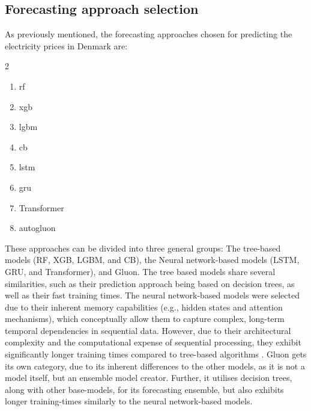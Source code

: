 \subsection{Forecasting approach selection}
As previously mentioned, the forecasting approaches chosen for predicting the 
electricity prices in Denmark are:
\begin{multicols}{2}
	\begin{enumerate}
		\item \gls{rf}
		\item \gls{xgb}
		\item \gls{lgbm}
		\item \gls{cb}
		\item \gls{lstm}
		\item \gls{gru}
		\item Transformer
		\item \gls{autogluon}
	\end{enumerate}
\end{multicols}
These approaches can be divided into three general 
groups: The tree-based models (RF, XGB, LGBM, and 
CB), the Neural network-based models (LSTM, GRU, 
and Transformer), and Gluon. The tree based 
models share several similarities, such as their 
prediction approach being based on decision trees, 
as well as their fast training times. The neural network-based models were 
selected due to their inherent memory capabilities (e.g., hidden states and 
attention mechanisms), which conceptually allow them to capture complex, 
long-term temporal dependencies in sequential data. However, due to their 
architectural complexity and the computational expense of sequential 
processing, they exhibit significantly longer training times compared to 
tree-based algorithms \cite[Sec. 2]{neuralNetworksMemory}. 
Gluon gets its own category, due to its 
inherent differences to the other models, as it is 
not a model itself, but an ensemble model creator. 
Further, it utilises decision trees, along with 
other base-models, for its forecasting ensemble, 
but also exhibits longer training-times similarly 
to the neural network-based models.\\

